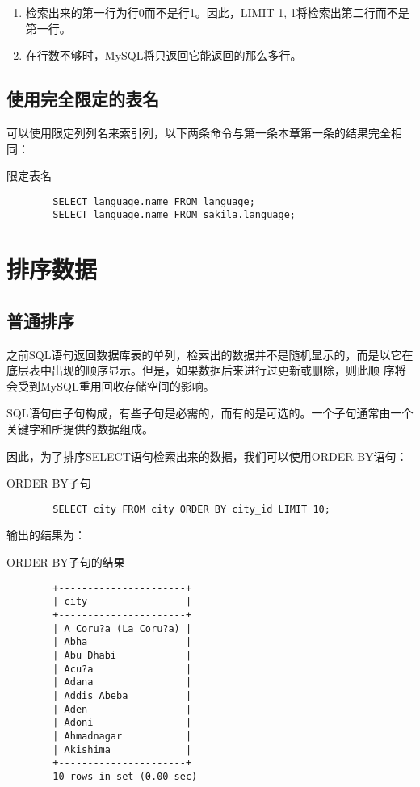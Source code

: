 \documentclass[UTF8]{article}
\begin{document}
\begin{orangebox}[frametitle={Tips 4.5}]
    \begin{enumerate}
        \item 检索出来的第一行为行0而不是行1。因此，LIMIT 1, 1将检索出第二行而不是第一行。
        \item 在行数不够时，MySQL将只返回它能返回的那么多行。
    \end{enumerate}
\end{orangebox}

\subsection{使用完全限定的表名}
可以使用限定列列名来索引列，以下两条命令与第一条本章第一条的结果完全相同：
\begin{listing}[H]
	\caption{限定表名}
	\label{code:distincttablename}
	\begin{verbatim}
        SELECT language.name FROM language;
        SELECT language.name FROM sakila.language;
\end{verbatim}
\end{listing}

\section{排序数据}
\subsection{普通排序}
之前SQL语句返回数据库表的单列，检索出的数据并不是随机显示的，而是以它在底层表中出现的顺序显示。但是，如果数据后来进行过更新或删除，则此顺
序将会受到MySQL重用回收存储空间的影响。
\begin{redbox}[frametitle={Defination 5.1 子句（clause）}]
    SQL语句由子句构成，有些子句是必需的，而有的是可选的。一个子句通常由一个关键字和所提供的数据组成。
\end{redbox}

因此，为了排序SELECT语句检索出来的数据，我们可以使用ORDER BY语句：
\begin{listing}[H]
	\caption{ORDER BY子句}
	\label{code:orderby}
	\begin{verbatim}
        SELECT city FROM city ORDER BY city_id LIMIT 10;
    \end{verbatim}
\end{listing}

输出的结果为：

\begin{listing}[H]
	\caption{ORDER BY子句的结果}
	\label{code:orderbyresult}
	\begin{verbatim}
        +----------------------+
        | city                 |
        +----------------------+
        | A Coru?a (La Coru?a) |
        | Abha                 |
        | Abu Dhabi            |
        | Acu?a                |
        | Adana                |
        | Addis Abeba          |
        | Aden                 |
        | Adoni                |
        | Ahmadnagar           |
        | Akishima             |
        +----------------------+
        10 rows in set (0.00 sec)
\end{verbatim}
\end{listing}
\end{document}
